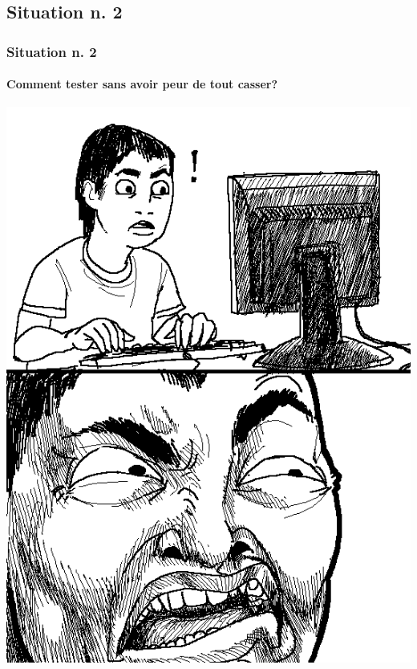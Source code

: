 \documentclass[t,11pt]{beamer}
\begin{document}
\subsection{Situation n. 2}
\begin{frame}[label=sit2]
        \frametitle{Situation n. 2}
        \framesubtitle{Comment tester sans avoir peur de tout casser?}
        \begin{center}
                \vspace{-5mm}
        \includegraphics[width=\linewidth,height=0.8\textheight,keepaspectratio]{./img/debugging}
        \end{center}
\end{frame}
\end{document}
